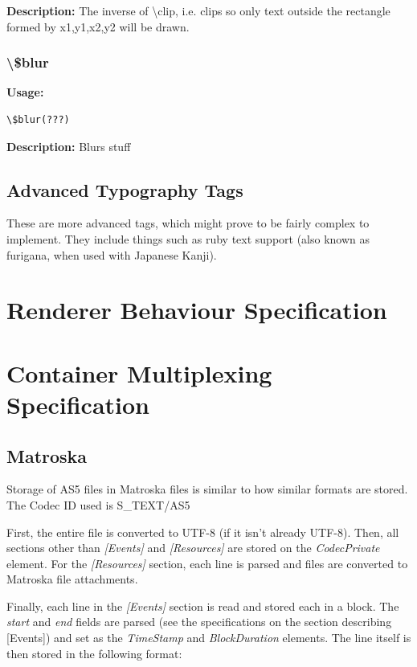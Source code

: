 \documentclass{spec}
\begin{document}
\textbf{Description:}
The inverse of \textbackslash clip, i.e. clips so only text outside the rectangle formed
by x1,y1,x2,y2 will be drawn.

\subsubsection{\textbackslash \$blur}
\textbf{Usage:}
\begin{verbatim}
\$blur(???)
\end{verbatim}

\textbf{Description:}
Blurs stuff

\subsection{Advanced Typography Tags}
These are more advanced tags, which might prove to be fairly complex to implement. They include
things such as ruby text support (also known as furigana, when used with Japanese Kanji).



\newpage
\section{Renderer Behaviour Specification}


\newpage
\section{Container Multiplexing Specification}

\subsection{Matroska}
Storage of AS5 files in Matroska files is similar to how similar formats are stored.\cite{mkv ssa}
The Codec ID used is \textsc{S\_TEXT/AS5}

First, the entire file is converted to UTF-8 (if it isn't already UTF-8). Then, all sections other
than \emph{[Events]} and \emph{[Resources]} are stored on the \emph{CodecPrivate} element. For the
\emph{[Resources]} section, each line is parsed and files are converted to Matroska file attachments.

Finally, each line in the \emph{[Events]} section is read and stored each in a block. The \emph{start}
and \emph{end} fields are parsed (see the specifications on the section describing [Events]) and set
as the \emph{TimeStamp} and \emph{BlockDuration} elements. The line itself is then stored in the
following format:
\end{document}
